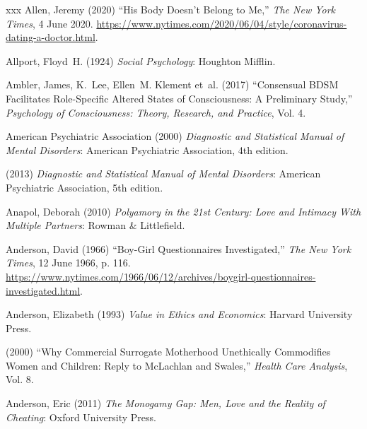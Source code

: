 \documentclass[]{jlreq} \usepackage{mystyle}
\begin{document}
\begin{thebibliography}{xxx}
Allen, Jeremy (2020) ``His Body Doesn't Belong to Me,'' \emph{The New York
  Times}, 4 June 2020.
  \url{https://www.nytimes.com/2020/06/04/style/coronavirus-dating-a-doctor.html}.

Allport, Floyd~H. (1924)  \textit{ Social Psychology}: Houghton Mifflin.

Ambler, James, K.~Lee, Ellen~M. Klement et~al. (2017) ``Consensual BDSM
  Facilitates Role-Specific Altered States of Consciousness: A Preliminary
  Study,'' \textit{ Psychology of Consciousness: Theory, Research, and
  Practice}, Vol. 4.

{American Psychiatric Association} (2000)  \textit{ Diagnostic and Statistical
  Manual of Mental Disorders}: American Psychiatric Association, 4th edition.

 \bysame{}  (2013)  \textit{ Diagnostic and Statistical Manual of Mental
  Disorders}: American Psychiatric Association, 5th edition.

Anapol, Deborah (2010)  \textit{ Polyamory in the 21st Century: Love and
  Intimacy With Multiple Partners}: Rowman \& Littlefield.

Anderson, David (1966) ``Boy-Girl Questionnaires Investigated,'' \emph{The New
  York Times}, 12 June 1966, p. 116.
  \url{https://www.nytimes.com/1966/06/12/archives/boygirl-questionnaires-investigated.html}.

Anderson, Elizabeth (1993)  \textit{ Value in Ethics and Economics}: Harvard
  University Press.

 \bysame{}  (2000) ``Why Commercial Surrogate Motherhood Unethically
  Commodifies Women and Children: Reply to McLachlan and Swales,'' \textit{
  Health Care Analysis}, Vol. 8.

Anderson, Eric (2011)  \textit{ The Monogamy Gap: Men, Love and the Reality of
  Cheating}: Oxford University Press.


\end{thebibliography}
\end{document}
